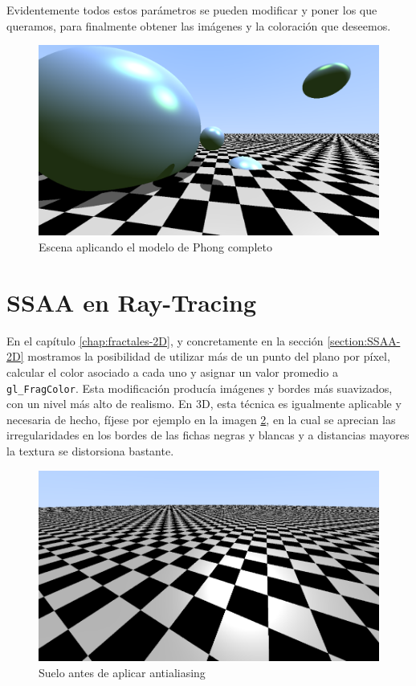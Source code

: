 Evidentemente todos estos parámetros se pueden modificar y poner los que queramos, para finalmente obtener las imágenes y la coloración que deseemos.

\begin{figure} [ht]
    \centering
    \includegraphics[width=12cm]{img/C8/phong-final.png}
    \caption{Escena aplicando el modelo de Phong completo}
    \label{fig:phong-final}
\end{figure}

\section{SSAA en Ray-Tracing}

En el capítulo \ref{chap:fractales-2D}, y concretamente en la sección \ref{section:SSAA-2D} mostramos la posibilidad de utilizar más de un punto del plano por píxel, calcular el color asociado a cada uno y asignar un valor promedio a \verb|gl_FragColor|. Esta modificación producía imágenes y bordes más suavizados, con un nivel más alto de realismo. En 3D, esta técnica es igualmente aplicable y necesaria de hecho, fíjese por ejemplo en la imagen \ref{fig:no-antialiasing-3D}, en la cual se aprecian las irregularidades en los bordes de las fichas negras y blancas y a distancias mayores la textura se distorsiona bastante.

\begin{figure} [ht]
    \centering
    \includegraphics[width=12cm]{img/C8/no-antialiasing.png}
    \caption{Suelo antes de aplicar antialiasing}
    \label{fig:no-antialiasing-3D}
\end{figure}

